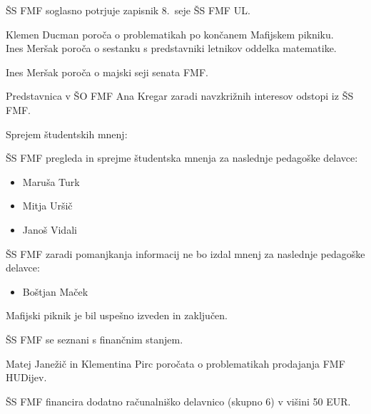 \documentclass{seja}
\begin{document}
\begin{ad}
	\item 
	ŠS FMF soglasno potrjuje zapisnik 8.~seje ŠS FMF UL.
	
	\item 
	Klemen Ducman poroča o problematikah po končanem Mafijskem pikniku. \\
	Ines Meršak poroča o sestanku s predstavniki letnikov oddelka matematike.
	
	\item
	Ines Meršak poroča o majski seji senata FMF.
	
	\item 
	\begin{sklep}
	Predstavnica v ŠO FMF Ana Kregar zaradi navzkrižnih interesov odstopi iz ŠS FMF.
	\end{sklep}
	
	\item 
	Sprejem študentskih mnenj:
	\begin{sklep}
		ŠS FMF pregleda in sprejme študentska mnenja za naslednje pedagoške delavce:
		\begin{itemize}
			\item Maruša Turk
			\item Mitja Uršič
			\item Janoš Vidali
		\end{itemize}
		
		ŠS FMF zaradi pomanjkanja informacij ne bo izdal mnenj za naslednje pedagoške delavce:
    	\begin{itemize}
    		\item Boštjan Maček
    	\end{itemize}	
	\end{sklep}

	\item 
	Mafijski piknik je bil uspešno izveden in zaključen.
	
	\item 
	ŠS FMF se seznani s finančnim stanjem.
	
	\item
	Matej Janežič in Klementina Pirc poročata o problematikah prodajanja FMF HUDijev.
	 	
	\item
	\begin{sklep}
		ŠS FMF financira dodatno računalniško delavnico (skupno 6) v višini 50 EUR.	
	\end{sklep}
	
\end{ad}
\end{document}
